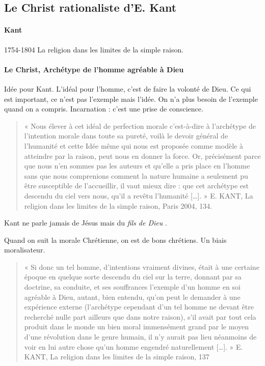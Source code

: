 \subsection{Le Christ rationaliste d’E. Kant}
\paragraph{Kant}
1754-1804 La religion dans les limites de la simple raison.

 \paragraph{Le Christ, Archétype de l'homme agréable à Dieu} Idée pour Kant. L'idéal pour l'homme, c'est de faire la volonté de Dieu. Ce qui est important, ce n'est pas l'exemple mais l'idée. On n'a plus besoin de l'exemple quand on a compris. 
Incarnation : c'est une prise de conscience.


\begin{quote}

   « Nous élever à cet idéal de perfection morale c’est-à-dire à l’archétype de l’intention morale
dans toute sa pureté, voilà le devoir général de l’humanité et cette Idée même qui nous est
proposée comme modèle à atteindre par la raison, peut nous en donner la force. Or,
précisément parce que nous n’en sommes pas les auteurs et qu’elle a pris place en l’homme
sans que nous comprenions comment la nature humaine a seulement pu être susceptible de
l’accueillir, il vaut mieux dire : que cet archétype est descendu du ciel vers nous, qu’il a
revêtu l’humanité […]. » E. KANT, La religion dans les limites de la simple raison, Paris
2004, 134. 
\end{quote}
Kant ne parle jamais de Jésus mais du \textit{fils de Dieu} .


Quand on suit la morale Chrétienne, on est de bons chrétiens. Un biais moralisateur. 


\begin{quote}
« Si donc un tel homme, d’intentions vraiment divines, était à une certaine époque en quelque
sorte descendu du ciel sur la terre, donnant par sa doctrine, sa conduite, et ses souffrances
l’exemple d’un homme en soi agréable à Dieu, autant, bien entendu, qu’on peut le demander à
une expérience externe (l’archétype cependant d’un tel homme ne devant être recherché nulle
part ailleurs que dans notre raison), s’il avait par tout cela produit dans le monde un bien
moral immensément grand par le moyen d’une révolution dans le genre humain, il n’y aurait
pas lieu néanmoins de voir en lui autre chose qu’un homme engendré naturellement […]. » E.
KANT, La religion dans les limites de la simple raison, 137
    
\end{quote}

